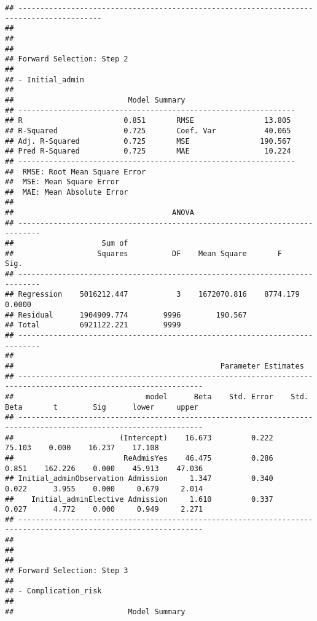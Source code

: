 \documentclass[
]{article}
\begin{document}
\begin{verbatim}
## -----------------------------------------------------------------------------------------
## 
## 
## 
## Forward Selection: Step 2 
## 
## - Initial_admin 
## 
##                          Model Summary                          
## ---------------------------------------------------------------
## R                       0.851       RMSE                13.805 
## R-Squared               0.725       Coef. Var           40.065 
## Adj. R-Squared          0.725       MSE                190.567 
## Pred R-Squared          0.725       MAE                 10.224 
## ---------------------------------------------------------------
##  RMSE: Root Mean Square Error 
##  MSE: Mean Square Error 
##  MAE: Mean Absolute Error 
## 
##                                    ANOVA                                    
## ---------------------------------------------------------------------------
##                    Sum of                                                  
##                   Squares          DF    Mean Square       F          Sig. 
## ---------------------------------------------------------------------------
## Regression    5016212.447           3    1672070.816    8774.179    0.0000 
## Residual      1904909.774        9996        190.567                       
## Total         6921122.221        9999                                      
## ---------------------------------------------------------------------------
## 
##                                               Parameter Estimates                                                
## ----------------------------------------------------------------------------------------------------------------
##                              model      Beta    Std. Error    Std. Beta       t        Sig      lower     upper 
## ----------------------------------------------------------------------------------------------------------------
##                        (Intercept)    16.673         0.222                  75.103    0.000    16.237    17.108 
##                         ReAdmisYes    46.475         0.286        0.851    162.226    0.000    45.913    47.036 
## Initial_adminObservation Admission     1.347         0.340        0.022      3.955    0.000     0.679     2.014 
##    Initial_adminElective Admission     1.610         0.337        0.027      4.772    0.000     0.949     2.271 
## ----------------------------------------------------------------------------------------------------------------
## 
## 
## 
## Forward Selection: Step 3 
## 
## - Complication_risk 
## 
##                          Model Summary                          

\end{verbatim}
\end{document}
